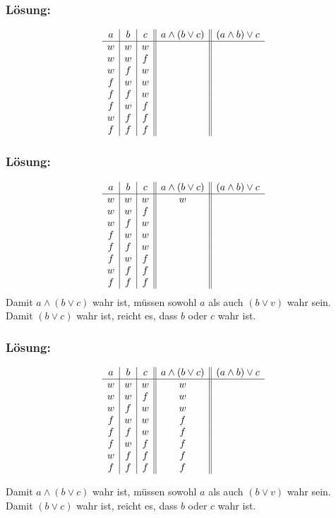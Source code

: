 \begin{frame}\frametitle{Lösung:}

$$
	\begin{array}{c | c | c || c || c}
		a	&b	&c	& a\land (b \lor c)	& (a\land b) \lor c	\\ \hline
		w	&w	&w	& &			\\
		w	&w	&f	& &			\\
		w	&f	&w	&&				\\
		f	&w	&w	&&\\
		f	&f	&w	&&				\\
		f	&w	&f	& &				\\
		w	&f	&f	&&				\\
		f	&f	&f	&&			\\
	\end{array}
$$



\end{frame}
%
%
\begin{frame}\frametitle{Lösung:}


$$
	\begin{array}{c | c | c || c || c}
		a	&b	&c	& a\land (b \lor c)	& (a\land b) \lor c	\\ \hline
		w	&w	&w	& w&			\\
		w	&w	&f	& &			\\
		w	&f	&w	&&				\\
		f	&w	&w	&&\\
		f	&f	&w	&&				\\
		f	&w	&f	& &				\\
		w	&f	&f	&&				\\
		f	&f	&f	&&			\\
	\end{array}
$$
Damit $a\land (b \lor c)$ wahr ist, müssen sowohl $a$ als auch $(b \lor v)$ wahr sein.\\
Damit $(b \lor c)$ wahr ist, reicht es, dass $b$ oder $c$ wahr ist.
\end{frame}
%
%
\begin{frame}\frametitle{Lösung:}

$$
	\begin{array}{c | c | c || c || c}
		a	&b	&c	& a\land (b \lor c)	& (a\land b) \lor c	\\ \hline
		w	&w	&w	& w				& 			\\
		w	&w	&f	& w				& 				\\
		w	&f	&w	& w				& 				\\
		f	&w	&w	& f				& 				\\
		f	&f	&w	& f				& 				\\
		f	&w	&f	& f				& 			\\
		w	&f	&f	& f				& 			\\
		f	&f	&f	& f				& 			\\
	\end{array}
$$

Damit $a\land (b \lor c)$ wahr ist, müssen sowohl $a$ als auch $(b \lor v)$ wahr sein.\\
Damit $(b \lor c)$ wahr ist, reicht es, dass $b$ oder $c$ wahr ist.

\end{frame}
